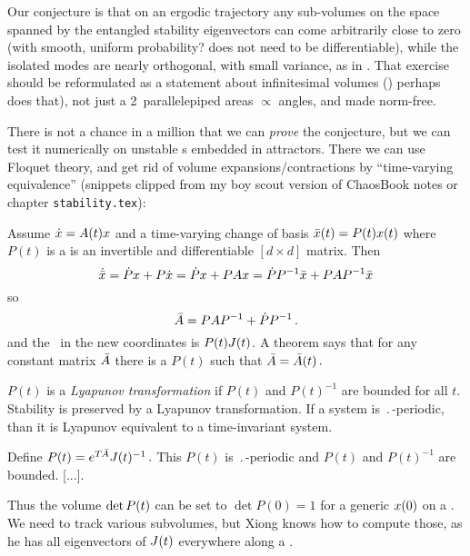 \begin{description}
{Our conjecture is that on an ergodic trajectory any sub-volumes on the
space spanned by the entangled stability eigenvectors can come
arbitrarily close to zero (with smooth, uniform probability? does not
need to be differentiable), while the isolated modes are nearly
orthogonal, with small variance, as in . That
exercise should be reformulated as a statement about infinitesimal volumes
() perhaps does that), not just a 2\dmn\ parallelepiped
areas $\propto$ angles, and made norm-free.

There is not a chance in a million that we can \emph{prove} the
conjecture, but we can test it numerically on unstable \po s embedded in
attractors. There we can use Floquet theory, and get rid of volume
expansions/contractions by
``time-varying equivalence'' (snippets clipped from my boy scout version of ChaosBook
notes or chapter \texttt{stability.tex}):

Assume $\dot{x}=A(t)x$ and a time-varying change of basis
\(\bar{x}(t)=P(t)x(t)\) where $P(t)$ is a is an invertible and
differentiable $[d\!\times\!d]$ matrix. Then
\[
\dot{\bar{x}} = \dot{P}{x} + P \dot{x}
= \dot{P}{x} + P A x
= \dot{P}P^{-1}\bar{x} + P A P^{-1} \bar{x}
\]
so
\[
\bar{A} = P A P^{-1} + \dot{P}P^{-1}
\,.
\]
and the \JacobianM\ in the new coordinates is $P(t)J (t)$. A theorem
says that for any constant matrix $\bar{A}$ there is a $P(t)$ such
that
\(
\bar{A} = \bar{A}(t)
\,.
\)

$P(t)$ is a \emph{Lyapunov transformation} if $P(t)$ and $P(t)^{-1}$ are
bounded for all $t$. Stability is preserved by a Lyapunov transformation.
If a system is $\period{}$-periodic, than it is Lyapunov equivalent to a
time-invariant system.

Define
\(
P(t) = e^{{T_{}}\bar{A}}J (t)^{-1}
\,.
\)
This $P(t)$ is $\period{}$-periodic and $P(t)$  and $P(t)^{-1}$ are bounded.
[...].

Thus the volume $\mbox{\rm det}\, P(t)$ can be set to $\det P(0)=1$ for a generic
$x(0)$ on a \po. We need to track various subvolumes, but Xiong knows
how to compute those, as he has all eigenvectors of $J(t)$
everywhere along a \po.
    }

\end{description}
